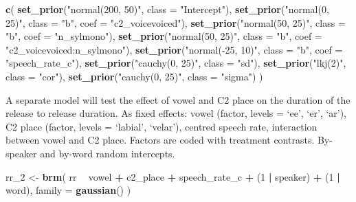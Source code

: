 \documentclass[11pt,]{article}
\newenvironment{Shaded}{\begin{snugshade}}{\end{snugshade}}
\newcommand{\DataTypeTok}[1]{\textcolor[rgb]{0.13,0.29,0.53}{#1}}
\newcommand{\DecValTok}[1]{\textcolor[rgb]{0.00,0.00,0.81}{#1}}
\newcommand{\KeywordTok}[1]{\textcolor[rgb]{0.13,0.29,0.53}{\textbf{#1}}}
\newcommand{\NormalTok}[1]{#1}
\newcommand{\OperatorTok}[1]{\textcolor[rgb]{0.81,0.36,0.00}{\textbf{#1}}}
\newcommand{\StringTok}[1]{\textcolor[rgb]{0.31,0.60,0.02}{#1}}
\begin{document}
\begin{Shaded}
\begin{Highlighting}[]
\KeywordTok{c}\NormalTok{(}
  \KeywordTok{set_prior}\NormalTok{(}\StringTok{"normal(200, 50)"}\NormalTok{, }\DataTypeTok{class =} \StringTok{"Intercept"}\NormalTok{),}
  \KeywordTok{set_prior}\NormalTok{(}\StringTok{"normal(0, 25)"}\NormalTok{, }\DataTypeTok{class =} \StringTok{"b"}\NormalTok{, }\DataTypeTok{coef =} \StringTok{"c2_voicevoiced"}\NormalTok{),}
  \KeywordTok{set_prior}\NormalTok{(}\StringTok{"normal(50, 25)"}\NormalTok{, }\DataTypeTok{class =} \StringTok{"b"}\NormalTok{, }\DataTypeTok{coef =} \StringTok{"n_sylmono"}\NormalTok{),}
  \KeywordTok{set_prior}\NormalTok{(}\StringTok{"normal(50, 25)"}\NormalTok{, }\DataTypeTok{class =} \StringTok{"b"}\NormalTok{, }\DataTypeTok{coef =} \StringTok{"c2_voicevoiced:n_sylmono"}\NormalTok{),}
  \KeywordTok{set_prior}\NormalTok{(}\StringTok{"normal(-25, 10)"}\NormalTok{, }\DataTypeTok{class =} \StringTok{"b"}\NormalTok{, }\DataTypeTok{coef =} \StringTok{"speech_rate_c"}\NormalTok{),}
  \KeywordTok{set_prior}\NormalTok{(}\StringTok{"cauchy(0, 25)"}\NormalTok{, }\DataTypeTok{class =} \StringTok{"sd"}\NormalTok{),}
  \KeywordTok{set_prior}\NormalTok{(}\StringTok{"lkj(2)"}\NormalTok{, }\DataTypeTok{class =} \StringTok{"cor"}\NormalTok{),}
  \KeywordTok{set_prior}\NormalTok{(}\StringTok{"cauchy(0, 25)"}\NormalTok{, }\DataTypeTok{class =} \StringTok{"sigma"}\NormalTok{)}
\NormalTok{)}
\end{Highlighting}
\end{Shaded}

A separate model will test the effect of vowel and C2 place on the
duration of the release to release duration. As fixed effects: vowel
(factor, levels = `ee', `er', `ar'), C2 place (factor, levels =
`labial', `velar'), centred speech rate, interaction between vowel and
C2 place. Factors are coded with treatment contrasts. By-speaker and
by-word random intercepts.

\begin{Shaded}
\begin{Highlighting}[]
\NormalTok{rr_}\DecValTok{2}\NormalTok{ <-}\StringTok{ }\KeywordTok{brm}\NormalTok{(}
\NormalTok{  rr }\OperatorTok{~}
\StringTok{    }\NormalTok{vowel }\OperatorTok{+}
\StringTok{    }\NormalTok{c2_place }\OperatorTok{+}
\StringTok{    }\NormalTok{speech_rate_c }\OperatorTok{+}
\StringTok{    }\NormalTok{(}\DecValTok{1} \OperatorTok{|}\StringTok{ }\NormalTok{speaker) }\OperatorTok{+}
\StringTok{    }\NormalTok{(}\DecValTok{1} \OperatorTok{|}\StringTok{ }\NormalTok{word),}
  \DataTypeTok{family =} \KeywordTok{gaussian}\NormalTok{()}
\NormalTok{)}
\end{Highlighting}
\end{Shaded}
\end{document}
